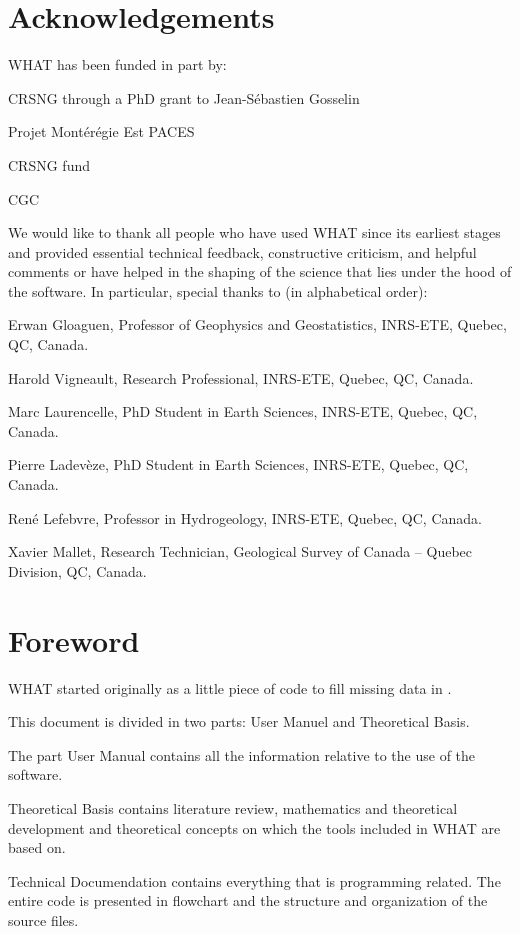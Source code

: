 \documentclass[WHATMANUAL.tex]{subfiles}
\begin{document}
\chapter*{Acknowledgements}

WHAT has been funded in part by:

\begin{description}
\item CRSNG through a PhD grant to Jean-S\'ebastien Gosselin
\item Projet Montérégie Est PACES
\item CRSNG fund
\item CGC
\end{description}

We would like to thank all people who have used WHAT since its earliest stages and provided essential technical feedback, constructive criticism, and helpful comments or have helped in the shaping of the science that lies under the hood of the software. In particular, special thanks to (in alphabetical order):

\begin{description}
\item Erwan Gloaguen, Professor of Geophysics and Geostatistics, INRS-ETE, Quebec, QC, Canada.
\item Harold Vigneault, Research Professional, INRS-ETE, Quebec, QC, Canada.
\item Marc Laurencelle, PhD Student in Earth Sciences, INRS-ETE, Quebec, QC, Canada.
\item Pierre Ladev\`eze, PhD Student in Earth Sciences, INRS-ETE, Quebec, QC, Canada.
\item Ren\'e Lefebvre, Professor in Hydrogeology, INRS-ETE, Quebec, QC, Canada.
\item Xavier Mallet, Research Technician, Geological Survey of Canada – Quebec Division, QC, Canada.
\end{description}

\chapter*{Foreword}


WHAT started originally as a little piece of code to fill missing data in .

This document is divided in two parts: User Manuel and Theoretical Basis.

The part User Manual contains all the information relative to the use of the software.

Theoretical Basis contains literature review, mathematics and theoretical development and theoretical concepts on which the tools included in WHAT are based on.

Technical Documendation contains everything that is programming related. The entire code is presented in flowchart and the structure and organization of the source files.
\end{document}
